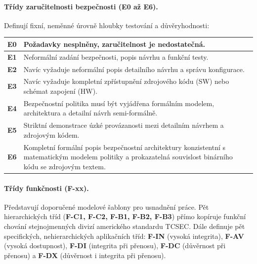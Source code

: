 \documentclass[10pt,a4paper]{article}
\begin{document}
	\paragraph*{Třídy zaručitelnosti bezpečnosti (E0 až E6).}
	Definují fixní, neměnné úrovně hloubky testování a důvěryhodnosti:
	\begin{center}
		\small
		\begin{tabular}{|l|p{11.0cm}|}
			\hline
			\textbf{E0} & Požadavky nesplněny, zaručitelnost je nedostatečná.\\ \hline
			\textbf{E1} & Neformální zadání bezpečnosti, popis návrhu a funkční testy.\\ \hline
			\textbf{E2} & Navíc vyžaduje neformální popis detailního návrhu a správu konfigurace.\\ \hline
			\textbf{E3} & Navíc vyžaduje kompletní zpřístupnění zdrojového kódu (SW) nebo schémat zapojení (HW).\\ \hline
			\textbf{E4} & Bezpečnostní politika musí být vyjádřena formálním modelem, architektura a detailní návrh semi-formálně.\\ \hline
			\textbf{E5} & Striktní demonstrace úzké provázanosti mezi detailním návrhem a zdrojovým kódem.\\ \hline
			\textbf{E6} & Kompletní formální popis bezpečnostní architektury konzistentní s matematickým modelem politiky a prokazatelná souvislost binárního kódu se zdrojovým textem.\\ \hline 
		\end{tabular}
	\end{center}
	

	\paragraph*{Třídy funkčnosti (F-xx).}
	Představují doporučené modelové šablony pro usnadnění práce. Pět hierarchických tříd (\textbf{F-C1, F-C2, F-B1, F-B2, F-B3}) přímo kopíruje funkční chování stejnojmenných divizí amerického standardu TCSEC. Dále definuje pět specifických, nehierarchických aplikačních tříd: \textbf{F-IN} (vysoká integrita), \textbf{F-AV} (vysoká dostupnost), \textbf{F-DI} (integrita při přenosu), \textbf{F-DC} (důvěrnost při přenosu) a \textbf{F-DX} (důvěrnost i integrita při přenosu).
	
	
\end{document}

